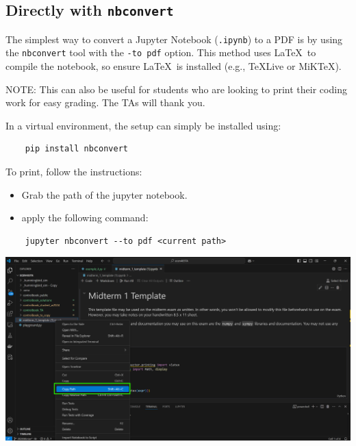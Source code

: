 \documentclass{article}
\begin{document}
\subsection{Directly with \texttt{nbconvert}}

The simplest way to convert a Jupyter Notebook (\texttt{.ipynb}) to a PDF is by using the \texttt{nbconvert} tool with the \texttt{-to pdf} option. This method uses \LaTeX~to compile the notebook, so ensure \LaTeX~is installed (e.g., TeXLive or MiKTeX).

NOTE: This can also be useful for students who are looking to print their coding work for easy grading. The TAs will thank you. 

In a virtual environment, the setup can simply be installed using: 

    \begin{verbatim}
    pip install nbconvert
    \end{verbatim}

To print, follow the instructions:

\begin{itemize}
    \item Grab the path of the jupyter notebook.
    \item apply the following command:
\end{itemize}
\begin{verbatim}
    jupyter nbconvert --to pdf <current path>
\end{verbatim}

\begin{center}
    \includegraphics[width=\linewidth]{pic9-copy_path.png} 
\end{center}
\end{document}
